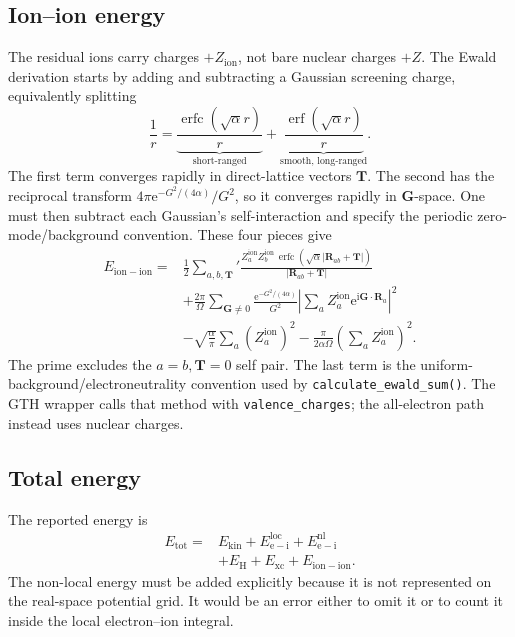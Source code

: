 \documentclass[10pt,twocolumn]{article}
\newcommand{\ii}{\mathrm{i}}
\newcommand{\e}{\mathrm{e}}
\newcommand{\zion}{Z_{\mathrm{ion}}}
\newcommand{\gvec}{\mathbf G}
\newcommand{\Rvec}{\mathbf R}
\newcommand{\code}[1]{\texttt{#1}}
\DeclareMathOperator{\erf}{erf}
\DeclareMathOperator{\erfc}{erfc}
\begin{document}
\subsection{Ion--ion energy}

The residual ions carry charges \(+\zion\), not bare nuclear charges \(+Z\).
The Ewald derivation starts by adding and subtracting a Gaussian screening
charge, equivalently splitting
\begin{equation}
\frac1r=
\underbrace{\frac{\erfc(\sqrt\alpha r)}{r}}_{\text{short-ranged}}
+\underbrace{\frac{\erf(\sqrt\alpha r)}{r}}_{\text{smooth, long-ranged}}.
\end{equation}
The first term converges rapidly in direct-lattice vectors \(\mathbf T\).
The second has the reciprocal transform
\(4\pi\e^{-G^2/(4\alpha)}/G^2\), so it converges rapidly in \(\gvec\)-space.
One must then subtract each Gaussian's self-interaction and specify the
periodic zero-mode/background convention.  These four pieces give
\begin{align}
E_{\mathrm{ion-ion}}
={}&\frac12\sum_{a,b,\mathbf T}'\!
\frac{Z_a^{\mathrm{ion}}Z_b^{\mathrm{ion}}\,
\erfc(\sqrt{\alpha}|\Rvec_{ab}+\mathbf T|)}
{|\Rvec_{ab}+\mathbf T|}
\nonumber\\
&+\frac{2\pi}{\Omega}\sum_{\gvec\ne0}
\frac{\e^{-G^2/(4\alpha)}}{G^2}
\left|\sum_aZ_a^{\mathrm{ion}}
\e^{\ii\gvec\cdot\Rvec_a}\right|^2
\nonumber\\
&-\sqrt{\frac{\alpha}{\pi}}\sum_a
(Z_a^{\mathrm{ion}})^2
-\frac{\pi}{2\alpha\Omega}
\left(\sum_aZ_a^{\mathrm{ion}}\right)^2.
\label{eq:ewald}
\end{align}
The prime excludes the \(a=b,\mathbf T=0\) self pair.  The last term is the
uniform-background/electroneutrality convention used by
\code{calculate\_ewald\_sum()}.  The GTH wrapper calls that method with
\code{valence\_charges}; the all-electron path instead uses nuclear charges.

\subsection{Total energy}

The reported energy is
\begin{align}
E_{\mathrm{tot}}
={}&E_{\mathrm{kin}}
+E_{\mathrm{e-i}}^{\mathrm{loc}}
+E_{\mathrm{e-i}}^{\mathrm{nl}}
\nonumber\\
&+E_{\mathrm H}+E_{\mathrm{xc}}
+E_{\mathrm{ion-ion}}.
\label{eq:etot}
\end{align}
The non-local energy must be added explicitly because it is not represented
on the real-space potential grid.  It would be an error either to omit it or
to count it inside the local electron--ion integral.
\end{document}
